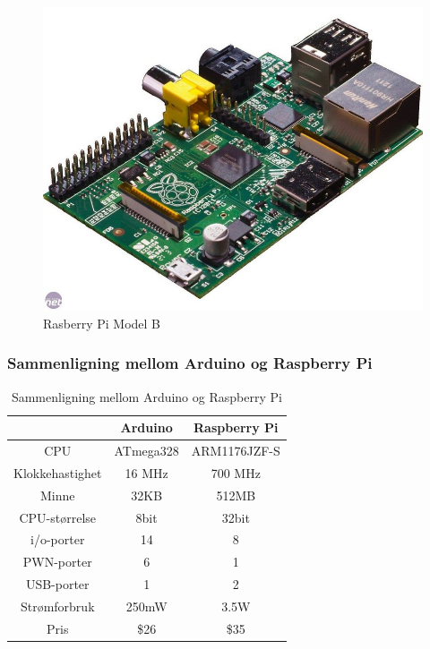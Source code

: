 \begin{figure}[h!]
\centering
\includegraphics[scale = 0.25]{img/pi.jpg}
\caption{Rasberry Pi Model B}
\end{figure}  

\subsubsection{Sammenligning mellom Arduino og Raspberry Pi}
\begin{table}[h!]
\caption{Sammenligning mellom Arduino og Raspberry Pi}
\centering
\begin{tabular}{ |c |c |c| }
	\hline
   & Arduino & Raspberry Pi \\
	\hline
  CPU & 	ATmega328 & ARM1176JZF-S \\
  Klokkehastighet & 16 MHz & 700 MHz \\
	Minne & 32KB & 512MB\\ 
	CPU-størrelse & 8bit & 32bit\\
	i/o-porter & 14 & 8 \\
	PWN-porter & 6 & 1 \\
	USB-porter & 1 & 2 \\
	Strømforbruk & 250mW & 3.5W\\
	Pris & \$26 & \$35 \\
	\hline  
\end{tabular}
\end{table}


